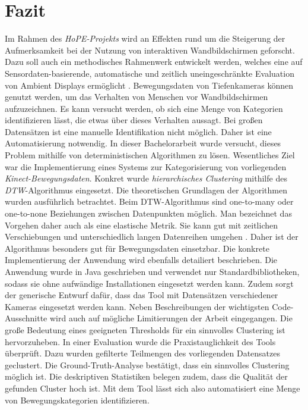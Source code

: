 \chapter{Fazit}
\label{chapter7}
Im Rahmen des \emph{HoPE-Projekts} wird an Effekten
rund um die Steigerung der Aufmerksamkeit bei der Nutzung von interaktiven Wandbildschirmen geforscht.
Dazu soll auch ein methodisches Rahmenwerk entwickelt werden, welches eine auf Sensordaten-basierende,
automatische und zeitlich uneingeschränkte Evaluation von Ambient Displays ermöglicht \citep{unibw_honeypot-effekt_2021}.
Bewegungsdaten von Tiefenkameras können genutzt werden,
um das Verhalten von Menschen vor Wandbildschirmen aufzuzeichnen.
Es kann versucht werden, ob sich eine Menge von Kategorien identifizieren lässt,
die etwas über dieses Verhalten aussagt.
Bei großen Datensätzen ist eine manuelle Identifikation nicht möglich.
Daher ist eine Automatisierung notwendig.
In dieser Bachelorarbeit wurde versucht, dieses Problem mithilfe von deterministischen Algorithmen zu lösen.
Wesentliches Ziel war die Implementierung eines Systems zur Kategorisierung von vorliegenden \emph{Kinect-Bewegungsdaten}.
Konkret wurde \emph{hierarchisches Clustering} mithilfe des \emph{\ac{DTW}}-Algorithmus eingesetzt.
Die theoretischen Grundlagen der Algorithmen wurden ausführlich betrachtet. 
Beim \ac*{DTW}-Algorithmus sind one-to-many oder one-to-none Beziehungen zwischen Datenpunkten möglich.
Man bezeichnet das Vorgehen daher auch als eine elastische Metrik.
Sie kann gut mit zeitlichen Verschiebungen und unterschiedlich langen Datenreihen umgehen \citep{aghabozorgi_time-series_2015}.
Daher ist der Algorithmus besonders gut für Bewegungsdaten einsetzbar.
Die konkrete Implementierung der Anwendung wird ebenfalls detailiert beschrieben.
Die Anwendung wurde in Java geschrieben und verwendet nur Standardbibliotheken,
sodass sie ohne aufwändige Installationen eingesetzt werden kann.
Zudem sorgt der generische Entwurf dafür, dass das Tool mit Datensätzen verschiedener Kameras eingesetzt werden kann.
Neben Beschreibungen der wichtigsten Code-Ausschnitte
wird auch auf mögliche Limitierungen der Arbeit eingegangen.
Die große Bedeutung eines geeigneten Thresholds für ein sinnvolles Clustering ist hervorzuheben.
In einer Evaluation wurde die Praxistauglichkeit des Tools überprüft.
Dazu wurden gefilterte Teilmengen des vorliegenden Datensatzes geclustert.
Die Ground-Truth-Analyse bestätigt, dass ein sinnvolles Clustering möglich ist.
Die deskriptiven Statistiken belegen zudem, dass die Qualität der gefunden Cluster hoch ist.
Mit dem Tool lässt sich also automatisiert eine Menge von Bewegungskategorien identifizieren.